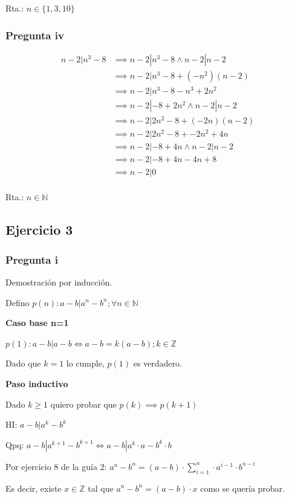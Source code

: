 Rta.: $ n \in \{ 1,3,10 \} $

\subsubsection{Pregunta iv}
\begin{align*}
    n-2 | n^3-8 &\implies n-2 | n^3-8 \wedge n-2 | n-2 \\
    &\implies n-2 | n^3-8 +(-n^2)(n-2) \\
    &\implies n-2 | n^3 - 8 -n^3 + 2n^2 \\
    &\implies n-2 | - 8 + 2n^2 \wedge n-2 | n-2 \\
    &\implies n-2 | 2n^2 - 8 + (-2n)(n-2) \\
    &\implies n-2 | 2n^2 - 8 + -2n^2 + 4n \\
    &\implies n-2 | - 8 + 4n \wedge n-2 | n-2 \\
    &\implies n-2 | - 8 + 4n -4n+8 \\
    &\implies n-2 | 0 \\
\end{align*}

Rta.: $ n \in \mathbb{N} $

\subsection{Ejercicio 3}
\subsubsection{Pregunta i}
Demostración por inducción.

Defino $ p(n): a-b | a^n-b^n; \forall n \in \mathbb{N} $

\textbf{Caso base n=1}

$ p(1): a-b | a-b \iff a-b = k(a-b); k \in \mathbb{Z} $

Dado que $ k = 1 $ lo cumple, $ p(1) $ es verdadero.

\textbf{Paso inductivo}

Dado $ k \geq 1 $ quiero probar que $ p(k) \implies p(k+1) $

HI: $ a-b | a^k-b^k $

Qpq: $ a-b | a^{k+1}-b^{k+1} \iff a-b | a^k \cdot a - b^k \cdot b $

Por ejercicio 8 de la guía 2: $ a^n - b^n = (a-b) \cdot \sum_{i=1}^{n}\cdot a^{i-1}\cdot b^{n-i} $

Es decir, existe $ x \in \mathbb{Z} $ tal que $ a^n - b^n = (a-b) \cdot x $ como se quería probar.

